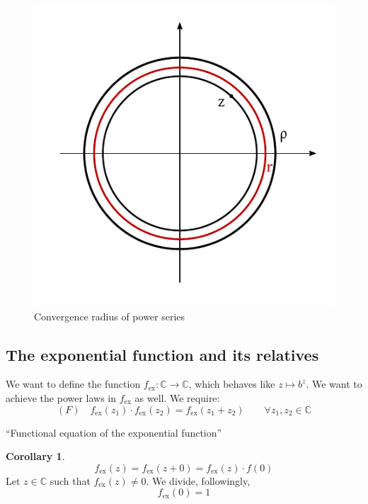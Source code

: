 \documentclass[a4paper,landscape,twocolumn]{article}
\theoremstyle{definition}
\newtheorem{cor}{Corollary}
\begin{document}
\begin{figure}[!h]
  \begin{center}
    \includegraphics{img/convergence_radius_power_series.pdf}
    \caption{Convergence radius of power series}
    \label{img:conv-radius}
  \end{center}
\end{figure}

\subsection{The exponential function and its relatives}

We want to define the function $f_{\text{ex}}: \mathbb C \to \mathbb C$,
which behaves like $z \mapsto b^z$.
We want to achieve the power laws in $f_{\text{ex}}$ as well. We require:
\[
  (F) \quad f_{\text{ex}}(z_1) \cdot f_{\text{ex}}(z_2) = f_{\text{ex}}(z_1 + z_2)
  \qquad \forall z_1, z_2 \in \mathbb C
\]
\begin{center}
  \enquote{Functional equation of the exponential function}
\end{center}

\begin{cor}
  \[ f_{\text{ex}}(z) = f_{\text{ex}}(z + 0) = f_{\text{ex}}(z) \cdot f(0) \]
  Let $z \in \mathbb C$ such that $f_{\text{ex}}(z) \neq 0$. We divide, followingly,
  \[ f_{\text{ex}}(0) = 1 \]
\end{cor}
\end{document}
